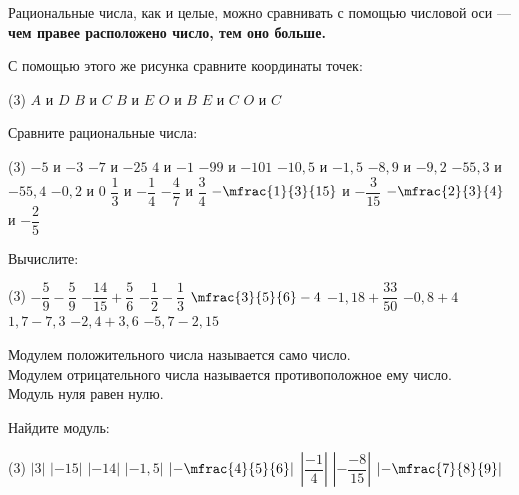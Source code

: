 \begin{class}[number=3-4]
\begin{definit}
		Рациональные числа, как и целые, можно сравнивать с помощью числовой оси --- \textbf{чем правее расположено число, тем оно больше.}
	\end{definit}
	\begin{listofex}[resume]
		\item С помощью этого же рисунка сравните координаты точек:
		\begin{tasks}(3)
			\task \( A \) и \( D \)
			\task \( B \) и \( C \)
			\task \( B \) и \( E \)
			\task \( O \) и \( B \)
			\task \( E \) и \( C \)
			\task \( O \) и \( C \)
		\end{tasks}
		\newpage
		\item Сравните рациональные числа:
		\begin{tasks}(3)
			\task \( -5 \) и \( -3 \)
			\task \( -7 \) и \( -25 \)
			\task \( 4 \) и \( -1 \)
			\task \( -99 \) и \( -101 \)
			\task \( -10,5 \) и \( -1,5 \)
			\task \( -8,9 \) и \( -9,2 \)
			\task \( -55,3 \) и \( -55,4 \)
			\task \( -0,2 \) и \( 0 \)
			\task \( \dfrac{1}{3} \) и \( -\dfrac{1}{4} \)
			\task \(- \dfrac{4}{7} \) и \( \dfrac{3}{4} \)
			\task \(- \mfrac{1}{3}{15} \) и \( -\dfrac{3}{15} \)
			\task \( -\mfrac{2}{3}{4} \) и \( -\dfrac{2}{5} \)
		\end{tasks}
		\item Вычислите:
		\begin{tasks}(3)
			\task \( -\dfrac{5}{9}-\dfrac{5}{9} \)
			\task \( -\dfrac{14}{15}+\dfrac{5}{6} \)
			\task \( -\dfrac{1}{2}-\dfrac{1}{3} \)
			\task \( \mfrac{3}{5}{6}-4 \)
			\task \( -1,18+\dfrac{33}{50} \)
			\task \( -0,8+4 \)
			\task \( 1,7-7,3 \)
			\task \( -2,4+3,6 \)
			\task \( -5,7-2,15 \)
		\end{tasks}
	\end{listofex}
	\begin{definit}
	Модулем положительного числа называется само число. \\
	Модулем отрицательного числа называется противоположное ему число. \\
	Модуль нуля равен нулю.
	\end{definit}
	\begin{listofex}[resume]
		\item Найдите модуль:
		\begin{tasks}(3)
			\task \(  |3| \)
			\task \(  |-15| \)
			\task \( |-14|  \)
			\task \( |-1,5|  \)
			\task \(  \left|-\mfrac{4}{5}{6}\right| \)
			\task \(  \left|\dfrac{-1}{4}\right| \)
			\task \(  \left|-\dfrac{-8}{15}\right| \)
			\task \(  \left|-\mfrac{7}{8}{9}\right| \)

\end{tasks}
\end{listofex}
\end{class}
